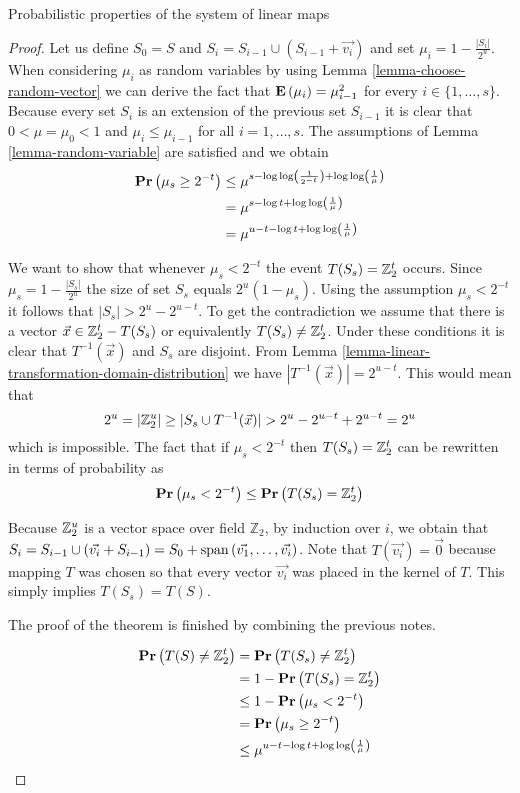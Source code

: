 \begin{section}{Probabilistic properties of the system of linear maps}
\begin{proof}
Let us define $S_0 = S$ and $S_i = S_{i - 1} \cup (S_{i - 1} + \vec{v_i})$ and set $\mu_i = 1 - \frac{|S_i|}{2 ^ u}$. When considering $\mu_i$ as random variables by using Lemma \ref{lemma-choose-random-vector} we can derive the fact that $\mathbf{E}\left(\mu_i\right) = \mu_{i - 1} ^ 2$ for every $i \in \{1, \dots, s \}$. Because every set $S_i$ is an extension of the previous set $S_{i - 1}$ it is clear that $0 < \mu = \mu_0 < 1$ and $\mu_i \leq \mu_{i - 1}$ for all $i = 1, \dots, s$. The assumptions of Lemma \ref{lemma-random-variable} are satisfied and we obtain
\[
\begin{split}
\mathbf{Pr}\left(\mu_s \geq 2 ^ {-t}\right) 
	& \leq \mu ^ {s - \log \log \left(\frac{1}{2 ^ {-t}}\right) + \log \log \left( \frac{1}{\mu} \right)} \\
	& = \mu ^ {s - \log t + \log \log \left(\frac{1}{\mu}\right)} \\
	& = \mu ^ {u - t - \log t + \log \log \left(\frac{1}{\mu}\right)}
\end{split}
\]

We want to show that whenever $\mu_s < 2^{-t}$ the event $T(S_s) = \mathbb{Z}_{2}^{t}$ occurs. Since $\mu_s = 1 - \frac{|S_s|}{2 ^ u}$ the size of set $S_s$ equals ${2 ^ u}(1 - \mu_s)$. Using the assumption $\mu_s < 2 ^ {-t}$ it follows that $|S_s| > 2^u - 2^{u - t}$. To get the contradiction we assume that there is a vector $\vec{x} \in \mathbb{Z}_{2}^{t} - T(S_s)$ or equivalently $T(S_s) \neq \mathbb{Z}_{2}^{t}$. Under these conditions it is clear that $T ^ {-1}(\vec{x})$ and $S_s$ are disjoint. From Lemma \ref{lemma-linear-transformation-domain-distribution} we have $|T ^ {-1}(\vec{x})| = 2 ^ {u - t}$. This would mean that
\[
2 ^ u = |\mathbb{Z}_{2}^{u}| \geq |S_s \cup T^{-1}(\vec{x})| > 2 ^ u - 2 ^ {u - t} + 2 ^ {u - t} = 2 ^u
\] which is impossible. The fact that if $\mu_s < 2^{-t}$ then $T(S_s) = \mathbb{Z}_{2}^{t}$ can be rewritten in terms of probability as
\[
	\mathbf{Pr}\left(\mu_s < 2^{-t}\right) \leq \mathbf{Pr}\left(T(S_s) = \mathbb{Z}_{2}^{t}\right)
\]

Because $\mathbb{Z}_{2}^{u}$ is a vector space over field $\mathbb{Z}_2$, by induction over $i$, we obtain that $S_i = S_{i - 1} \cup (\vec{v_i} + S_{i - 1}) = S_0 + \mathrm{span}\left({\vec{v_1}, \dots, \vec{v_i}}\right)$. Note that $T(\vec{v_i}) = \vec{0}$ because mapping $T$ was chosen so that every vector $\vec{v_i}$ was placed in the kernel of $T$. This simply implies $T(S_s) = T(S)$.

The proof of the theorem is finished by combining the previous notes.

\[
\begin{split}
\mathbf{Pr}\left(T(S) \neq \mathbb{Z}_{2}^{t}\right) 
	& = \mathbf{Pr}\left(T(S_s) \neq \mathbb{Z}_{2}^{t}\right)  \\
	& = 1 - \mathbf{Pr}\left(T(S_s) = \mathbb{Z}_{2}^{t}\right) \\
	& \leq 1 - \mathbf{Pr}\left(\mu_s < 2 ^ {-t}\right) \\
	& = \mathbf{Pr}\left(\mu_s \geq 2 ^ {-t}\right) \\
	& \leq \mu ^ {u - t - \log t + \log \log \left(\frac{1}{\mu}\right)} \\
\end{split}
\]
\end{proof}


\end{section}
